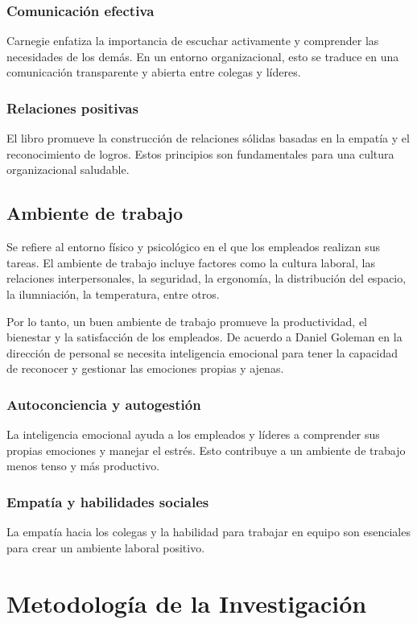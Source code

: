 \documentclass[journal]{IEEEtran}
\begin{document}
\subsubsection{Comunicación efectiva}
Carnegie enfatiza la importancia de escuchar activamente y comprender las necesidades de los demás. En un entorno organizacional, esto se traduce en una comunicación transparente y abierta entre colegas y líderes.

\subsubsection{Relaciones positivas}
El libro promueve la construcción de relaciones sólidas basadas en la empatía y el reconocimiento de logros. Estos principios son fundamentales para una cultura organizacional saludable.

\subsection{Ambiente de trabajo}
Se refiere al entorno físico y psicológico en el que los empleados realizan sus tareas. El ambiente de trabajo incluye factores como la cultura laboral, las relaciones interpersonales, la seguridad, la ergonomía, la distribución del espacio, la ilumniación, la temperatura, entre otros.

Por lo tanto, un buen ambiente de trabajo promueve la productividad, el bienestar y la satisfacción de los empleados. De acuerdo a Daniel Goleman en la dirección de personal se necesita inteligencia emocional para tener la capacidad de reconocer y gestionar las emociones propias y ajenas.

\subsubsection{Autoconciencia y autogestión}
La inteligencia emocional ayuda a los empleados y líderes a comprender sus propias emociones y manejar el estrés. Esto contribuye a un ambiente de trabajo menos tenso y más productivo.

\subsubsection{Empatía y habilidades sociales}
La empatía hacia los colegas y la habilidad para trabajar en equipo son esenciales para crear un ambiente laboral positivo.

\newpage

\section{Metodología de la Investigación}
\end{document}
